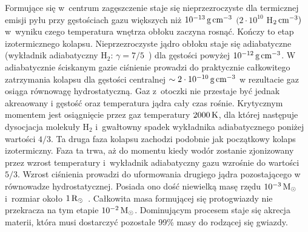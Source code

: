 \par Formujące się w~centrum zagęszczenie staje się nieprzezroczyste dla
termicznej emisji pyłu przy gęstościach gazu większych niż $10^{-13}\hbox{$\thinspace\textrm{g}$}\hbox{$\thinspace\textrm{cm}$}^{-3}$
$(2\cdot10^{10}$ H$_2\hbox{$\thinspace\textrm{cm}$}^{-3})$~\cite{L69} w~wyniku czego temperatura wnętrza
obłoku zaczyna rosnąć. Kończy to etap izotermicznego kolapsu. Nieprzezroczyste
jądro obłoku staje się adiabatyczne (wykładnik adiabatyczny H$_2$: $\gamma =
7/5$~\cite{L69}) dla gęstości powyżej $10^{-12}\hbox{$\thinspace\textrm{g}$}\hbox{$\thinspace\textrm{cm}$}^{-3}$. W adiabatycznie
ściskanym gazie ciśnienie prowadzi do praktycznie
całkowitego zatrzymania kolapsu dla gęstości centralnej $\sim 2\cdot
10^{-10}\hbox{$\thinspace\textrm{g}$}\hbox{$\thinspace\textrm{cm}$}^{-3}$ w rezultacie gaz  osiąga równowagę hydrostatyczną. Gaz
z~otoczki nie przestaje być jednak akreaowany i gęstość oraz temperatura jądra
cały czas rośnie. Krytycznym momentem jest osiągnięcie przez gaz temperatury
$2000\hbox{$\thinspace\textrm{K}$}$, dla której następuje dysocjacja molekuły H$_2$ i~gwałtowny spadek
wykładnika adiabatycznego poniżej wartości $4/3$. Ta druga faza kolapsu zachodzi
podobnie jak początkowy kolaps izotermiczny. Faza ta trwa, aż do momentu kiedy
wodór zostanie zjonizowany przez wzrost temperatury i~wykładnik adiabatyczny
gazu wzrośnie do wartości $5/3$.  Wzrost ciśnienia prowadzi do uformowania
drugiego jądra pozostającego w równowadze hydrostatycznej. Posiada ono dość
niewielką masę rzędu $10^{-3}\hbox{$\mathrm{\thinspace M_{\odot}}$}$ i~rozmiar około $1\hbox{$\mathrm{\thinspace R_{\odot}}$}$~\cite{MI00}.
Całkowita masa formującej się protogwiazdy nie przekracza na tym etapie
$10^{-2}\hbox{$\mathrm{\thinspace M_{\odot}}$}$.  Dominującym procesem staje się akrecja materii, która musi
dostarczyć pozostałe 99\% masy do rodzącej się gwiazdy. 

